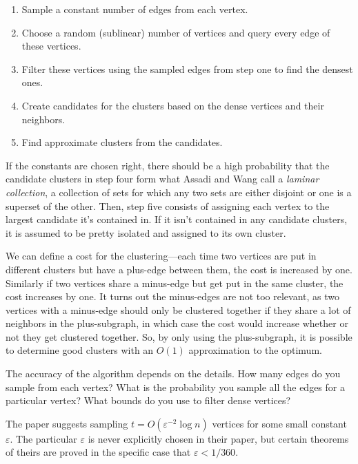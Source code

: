 \documentclass[
]{article}
\providecommand{\tightlist}{%
  \setlength{\itemsep}{0pt}\setlength{\parskip}{0pt}}
\begin{document}
\begin{enumerate}
  \tightlist
  \item
        Sample a constant number of edges from each vertex.
  \item
        Choose a random (sublinear) number of vertices and query every edge of
        these vertices.
  \item
        Filter these vertices using the sampled edges from step one to find
        the densest ones.
  \item
        Create candidates for the clusters based on the dense vertices and
        their neighbors.
  \item
        Find approximate clusters from the candidates.
\end{enumerate}

If the constants are chosen right, there should be a high probability
that the candidate clusters in step four form what Assadi and Wang call
a \emph{laminar collection}, a collection of sets for which any two sets
are either disjoint or one is a superset of the other. Then,
step five consists of assigning each vertex to the largest candidate
it's contained in. If it isn't contained
in any candidate clusters, it is assumed to be pretty isolated and
assigned to its own cluster.

We can define a cost for the clustering---each time two vertices are
put in different clusters but have a plus-edge between them, the cost is
increased by one. Similarly if two vertices share a minus-edge but get
put in the same cluster, the cost increases by one. It turns out the
minus-edges are not too relevant, as two vertices with a minus-edge
should only be clustered together if they share a lot of neighbors in
the plus-subgraph, in which case the cost would increase whether or not
they get clustered together. So, by only using the plus-subgraph, it is
possible to determine good clusters with an {\(O(1)\)} approximation to
the optimum.

The accuracy of the algorithm depends on the details. How many edges do
you sample from each vertex? What is the probability you sample all the
edges for a particular vertex? What bounds do you use to filter dense
vertices?

The paper suggests sampling {\(t = O(\varepsilon^{- 2}\log n)\)}
vertices for some small constant {\(\varepsilon\)}. The particular
  {\(\varepsilon\)} is
never explicitly chosen in their paper, but certain theorems of theirs
are proved in the specific case that {\(\varepsilon < 1/360\)}.
\end{document}
